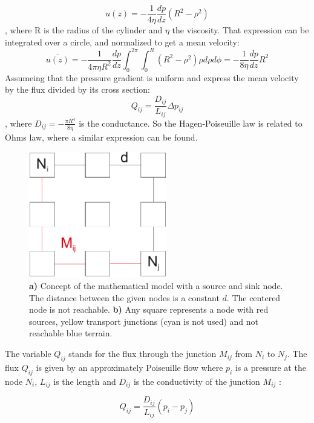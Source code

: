 \documentclass[11pt]{scrartcl}
\begin{document}
\begin{equation}
u(z)=-\frac{1}{4\eta}\frac{dp}{dz}(R^2-\rho^2)
\end{equation}
, where R is the radius of the cylinder and $\eta$ the viscosity. That expression can be integrated over a circle, and normalized to get a mean velocity:
\begin{equation}
\overline{u(z)}=-\frac{1}{4\pi\eta R^2}\frac{dp}{dz}\int_{0}^{2\pi}\int_{0}^{R}{(R^2-\rho^2)}\rho d\rho d\phi=-\frac{1}{8\eta}\frac{dp}{dz}R^2
\end{equation}
Assumeing that the pressure gradient is uniform and express the mean velocity by the flux divided by its cross section:
\begin{equation}
Q_{ij}=\frac{D_{ij}}{L_{ij}}\Delta p_{ij}
\end{equation}
, where $D_{ij}=-\frac{\pi R^4}{8\eta}$ is the conductance. So the Hagen-Poiseuille law is related to Ohms law, where a similar expression can be found.
\begin{figure}[H]
	\centering
	\includegraphics[width=6cm]{figures/figure1}
	\caption{\textbf{a)} Concept of the mathematical model with a source and sink node. The distance between the given nodes is a constant $d$. The centered node is not reachable. \textbf{b)} Any square represents a node with red sources, yellow transport junctions (cyan is not used) and not reachable blue terrain.}
	\label{fig:schema}
\end{figure}

The variable $Q_{ij}$ stands for the flux through the junction $M_{ij}$ from $N_i$ to $N_j$. The flux $Q_{ij}$ is given by an approximately Poiseuille flow where $p_i$ is a pressure at the node $N_i$, $L_{ij}$ is the length and $D_{ij}$ is the conductivity of the junction $M_{ij}$ :

\begin{equation}
	\label{eq:1}
	Q_{ij}=\frac{D_{ij}}{L_{ij}}\left(p_i-p_j\right)
\end{equation}
\end{document}

